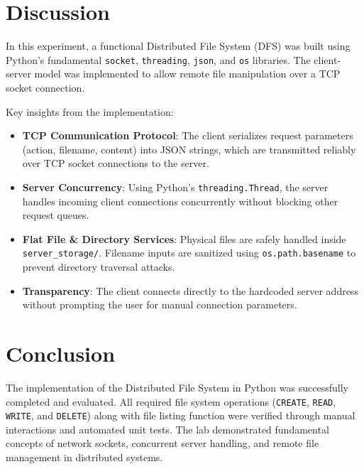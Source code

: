 \documentclass[main]{subfiles}
\begin{document}
\section*{Discussion}
In this experiment, a functional Distributed File System (DFS) was built using Python's fundamental \texttt{socket}, \texttt{threading}, \texttt{json}, and \texttt{os} libraries. The client-server model was implemented to allow remote file manipulation over a TCP socket connection.

Key insights from the implementation:
\begin{itemize}
    \item \textbf{TCP Communication Protocol}: The client serializes request parameters (action, filename, content) into JSON strings, which are transmitted reliably over TCP socket connections to the server.
    \item \textbf{Server Concurrency}: Using Python's \texttt{threading.Thread}, the server handles incoming client connections concurrently without blocking other request queues.
    \item \textbf{Flat File \& Directory Services}: Physical files are safely handled inside \texttt{server\_storage/}. Filename inputs are sanitized using \texttt{os.path.basename} to prevent directory traversal attacks.
    \item \textbf{Transparency}: The client connects directly to the hardcoded server address without prompting the user for manual connection parameters.
\end{itemize}

\section*{Conclusion}
The implementation of the Distributed File System in Python was successfully completed and evaluated. All required file system operations (\texttt{CREATE}, \texttt{READ}, \texttt{WRITE}, and \texttt{DELETE}) along with file listing function were verified through manual interactions and automated unit tests. The lab demonstrated fundamental concepts of network sockets, concurrent server handling, and remote file management in distributed systems.
\end{document}
